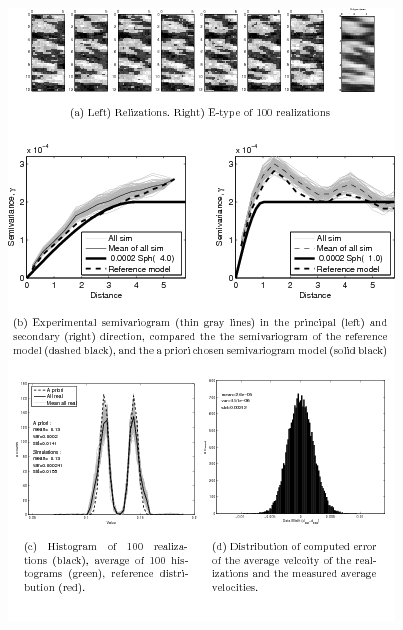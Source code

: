 \documentclass[12t]{article}
\begin{document}
\begin{figure}
\centering
  \includegraphics{manfig_7}
\caption[dssim conditional simulation]{}
\label{fig:dssim_conditional}
\end{figure}
\end{document}
